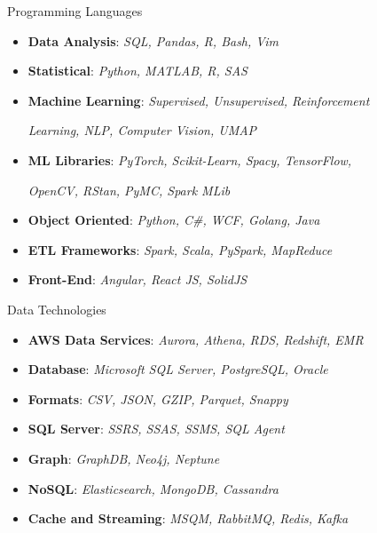 
\Technology
{Programming Languages}
{\begin{itemize}
    \item \textbf{Data Analysis}:
      \emph{SQL, Pandas, R, Bash, Vim}
    \item \textbf{Statistical}:
      \emph{Python, MATLAB, R, SAS}
    \item \textbf{Machine Learning}:
      \emph{Supervised, Unsupervised, Reinforcement}
      \newline \strut\hspace*{0.25 in}
      \emph{Learning, NLP, Computer Vision, UMAP}
    \item \textbf{ML Libraries}:
      \emph{PyTorch, Scikit-Learn, Spacy, TensorFlow,}
      \newline \strut\hspace*{0.25 in}
      \emph{OpenCV, RStan, PyMC, Spark MLib}
    \item \textbf{Object Oriented}:
      \emph{Python, C\#, WCF, Golang, Java}
    \item \textbf{ETL Frameworks}:
      \emph{Spark, Scala, PySpark, MapReduce}
    \item \textbf{Front-End}:
      \emph{Angular, React JS, SolidJS}
\end{itemize}}

\vspace*{0.01 in}

\Technology
{Data Technologies}
{\begin{itemize}
    \item \textbf{AWS Data Services}:
      \emph{Aurora, Athena, RDS, Redshift, EMR}
    \item \textbf{Database}:
      \emph{Microsoft SQL Server, PostgreSQL, Oracle}
    \item \textbf{Formats}:
      \emph{CSV, JSON, GZIP, Parquet, Snappy}
    \item \textbf{SQL Server}:
      \emph{SSRS, SSAS, SSMS, SQL Agent}
    \item \textbf{Graph}:
      \emph{GraphDB, Neo4j, Neptune}
    \item \textbf{NoSQL}:
      \emph{Elasticsearch, MongoDB, Cassandra}
    \item \textbf{Cache and Streaming}:
      \emph{MSQM, RabbitMQ, Redis, Kafka}
\end{itemize}}

\vspace*{0.01 in}

